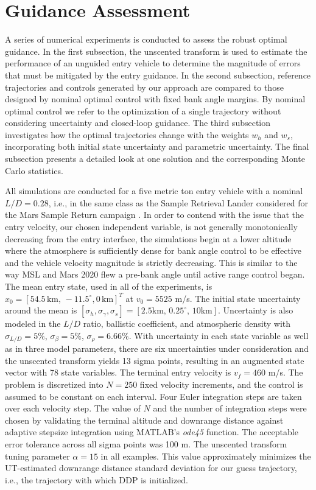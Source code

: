 \documentclass[journal ]{new-aiaa}
\begin{document}
\section*{Guidance Assessment}
A series of numerical experiments is conducted to assess the robust optimal guidance. In the first subsection, the unscented transform is used to estimate the performance of an unguided entry vehicle to determine the magnitude of errors that must be mitigated by the entry guidance. In the second subsection, reference trajectories and controls generated by our approach are compared to those designed by nominal optimal control with fixed bank angle margins. By nominal optimal control we refer to the optimization of a single trajectory without considering uncertainty and closed-loop guidance. The third subsection investigates how the optimal trajectories change with the weights $w_h$ and $w_s$, incorporating both initial state uncertainty and parametric uncertainty. The final subsection presents a detailed look at one solution and the corresponding Monte Carlo statistics.

All simulations are conducted for a five metric ton entry vehicle with a nominal $L/D=0.28$, i.e., in the same class as the Sample Retrieval Lander considered for the Mars Sample Return campaign \cite{MSR}. 
In order to contend with the issue that the entry velocity, our chosen independent variable, is not generally monotonically decreasing from the entry interface, 
the simulations begin at a lower altitude where the atmosphere is sufficiently dense for bank angle control to be effective and the vehicle velocity magnitude is strictly decreasing. This is similar to the way MSL and Mars 2020 flew a pre-bank angle until active range control began. The mean entry state, used in all of the experiments, is $x_0 = [54.5\,\mathrm{km},\,-11.5^{\circ}, 0\,\mathrm{km}]^T$ at $v_0 = 5525$ m/s. The initial state uncertainty around the mean is $[\sigma_h, \sigma_{\gamma}, \sigma_s ] = [2.5 \mathrm{km},\, 0.25^{\circ},\, 10\mathrm{ km}]$. Uncertainty is also modeled in the $L/D$ ratio, ballistic coefficient, and atmospheric density with $\sigma_{L/D} = 5\%$, $\sigma_{\beta} = 5\%$, $\sigma_{\rho} = 6.66\%$. With uncertainty in each state variable as well as in three model parameters, there are six uncertainties under consideration and the unscented transform yields 13 sigma points, resulting in an augmented state vector with 78 state variables. The terminal entry velocity is $v_f=460$ m/s. The problem is discretized into $N=250$ fixed velocity increments, and the control is assumed to be constant on each interval. Four Euler integration steps are taken over each velocity step. The value of $ N $ and the number of integration steps were chosen by validating the terminal altitude and downrange distance against adaptive stepsize integration using MATLAB's \textit{ode45} function. The acceptable error tolerance across all sigma points was 100 m. The unscented transform tuning parameter $\alpha=15$ in all examples. This value approximately minimizes the UT-estimated downrange distance standard deviation for our guess trajectory, i.e., the trajectory with which DDP is initialized. 
\end{document}
